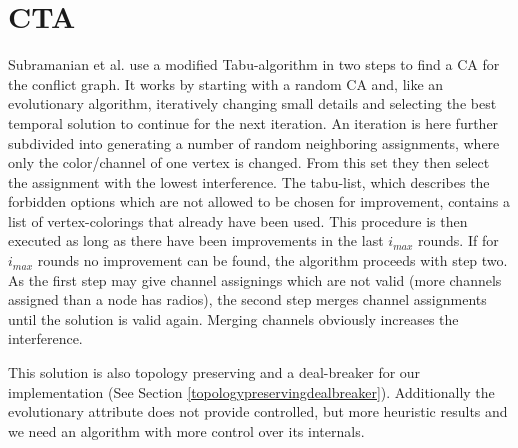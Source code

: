   \section{\ac{CTA}}
    Subramanian et al. \cite{CTA} use a modified Tabu-algorithm \cite{tabu} in two steps to find a \ac{CA} for the conflict graph.
    It works by starting with a random \ac{CA} and, like an evolutionary algorithm, 
    iteratively changing small details and selecting the best temporal solution to continue for the next iteration.
    An iteration is here further subdivided into generating a number of random neighboring assignments, where only the color/channel of one vertex is changed.
    From this set they then select the assignment with the lowest interference.
    The tabu-list, which describes the forbidden options which are not allowed to be chosen for improvement, contains a list of vertex-colorings that already have been used.
    This procedure is then executed as long as there have been improvements in the last \textit{$i_{max}$} rounds.
    If for \textit{$i_{max}$} rounds no improvement can be found, the algorithm proceeds with step two.
    As the first step may give channel assignings which are not valid (more channels assigned than a node has radios), the second step merges channel assignments 
    until the solution is valid again. Merging channels obviously increases the interference.
    
    This solution is also topology preserving and a deal-breaker for our implementation (See Section \ref{topologypreservingdealbreaker}).
    Additionally the evolutionary attribute does not provide controlled, but more heuristic results and we need an algorithm with more control over its internals.
